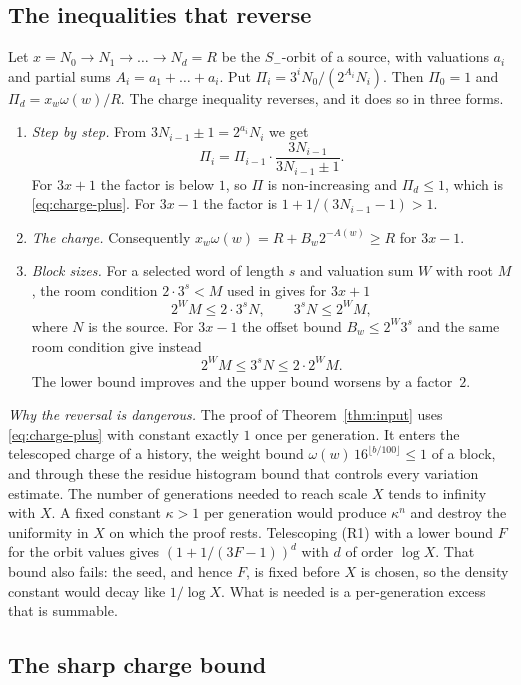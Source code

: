 \documentclass[11pt]{amsart}
\theoremstyle{definition}
\theoremstyle{remark}
\newcommand{\Sm}{S_{-}}
\begin{document}
\subsection{The inequalities that reverse}\label{subsec:reverse}
Let $x=N_0\to N_1\to\dots\to N_d=R$ be the $\Sm$-orbit of a source, with valuations $a_i$ and partial
sums $A_i=a_1+\dots+a_i$. Put $\Pi_i=3^{i}N_0/(2^{A_i}N_i)$. Then $\Pi_0=1$ and
$\Pi_d=x_w\omega(w)/R$. The charge inequality reverses, and it does so in three forms.
\begin{enumerate}[leftmargin=*,label=(R\arabic*)]
\item \emph{Step by step.} From $3N_{i-1}\pm1=2^{a_i}N_i$ we get
  \[
    \Pi_i=\Pi_{i-1}\cdot\frac{3N_{i-1}}{3N_{i-1}\pm1}.
  \]
  For $3x+1$ the factor is below $1$, so $\Pi$ is non-increasing and $\Pi_d\le1$, which is
  \eqref{eq:charge-plus}. For $3x-1$ the factor is $1+1/(3N_{i-1}-1)>1$.
\item \emph{The charge.} Consequently $x_w\omega(w)=R+B_w2^{-A(w)}\ge R$ for $3x-1$.
\item \emph{Block sizes.} For a selected word of length $s$ and valuation sum $W$ with root $M$,
  the room condition $2\cdot3^{s}<M$ used in \cite[(3.5)]{MazurM1} gives for $3x+1$
  \[
    2^{W}M\le2\cdot3^{s}N,\qquad 3^{s}N\le2^{W}M,
  \]
  where $N$ is the source. For $3x-1$ the offset bound $B_w\le2^{W}3^{s}$ and the same room
condition give instead
  \[
    2^{W}M\le3^{s}N\le2\cdot2^{W}M .
  \]
  The lower bound improves and the upper bound worsens by a factor~$2$.
\end{enumerate}

\noindent\emph{Why the reversal is dangerous.} The proof of Theorem~\ref{thm:input} uses \eqref{eq:charge-plus} with
constant exactly $1$ once per generation. It enters the telescoped charge of a history, the
weight bound $\omega(w)\,16^{\lfloor b/100\rfloor}\le1$ of a block, and through these the residue
histogram bound \cite[(3.9)]{MazurM1} that controls every variation estimate. The number of
generations needed to reach scale $X$ tends to infinity with $X$. A fixed constant $\kappa>1$ per
generation would produce $\kappa^{n}$ and destroy the uniformity in $X$ on which the proof rests.
Telescoping (R1) with a lower bound $F$ for the orbit values gives $(1+1/(3F-1))^{d}$ with $d$ of
order $\log X$. That bound also fails: the seed, and hence $F$, is fixed before $X$ is chosen, so
the density constant would decay like $1/\log X$. What is needed is a per-generation excess that is
summable.

\subsection{The sharp charge bound}
\end{document}
